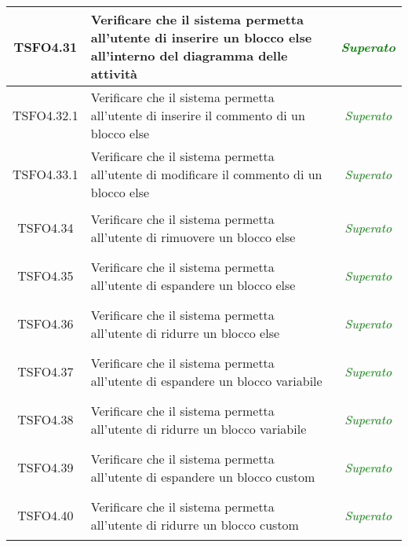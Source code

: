 \begin{longtable}{|c|>{}m{8cm}|c|}
\hypertarget{TSFO4.31}{TSFO4.31} & Verificare che il sistema permetta all'utente di inserire un blocco else all'interno del diagramma delle attività & \textcolor{Green}{\textit{Superato}}\\ \hline
\hypertarget{TSFO4.32.1}{TSFO4.32.1} & Verificare che il sistema permetta all'utente di inserire il commento di un blocco else & \textcolor{Green}{\textit{Superato}}\\ \hline
\hypertarget{TSFO4.33.1}{TSFO4.33.1} & Verificare che il sistema permetta all'utente di modificare il commento di un blocco else & \textcolor{Green}{\textit{Superato}}\\ \hline
\hypertarget{TSFO4.34}{TSFO4.34} & Verificare che il sistema permetta all'utente di rimuovere un blocco else & \textcolor{Green}{\textit{Superato}}\\ \hline
\hypertarget{TSFO4.35}{TSFO4.35} & Verificare che il sistema permetta all'utente di espandere un blocco else & \textcolor{Green}{\textit{Superato}}\\ \hline
\hypertarget{TSFO4.36}{TSFO4.36} & Verificare che il sistema permetta all'utente di ridurre un blocco else & \textcolor{Green}{\textit{Superato}}\\ \hline
\hypertarget{TSFO4.37}{TSFO4.37} & Verificare che il sistema permetta all'utente di espandere un blocco variabile & \textcolor{Green}{\textit{Superato}}\\ \hline
\hypertarget{TSFO4.38}{TSFO4.38} & Verificare che il sistema permetta all'utente di ridurre un blocco variabile & \textcolor{Green}{\textit{Superato}}\\ \hline
\hypertarget{TSFO4.39}{TSFO4.39} & Verificare che il sistema permetta all'utente di espandere un blocco custom & \textcolor{Green}{\textit{Superato}}\\ \hline
\hypertarget{TSFO4.40}{TSFO4.40} & Verificare che il sistema permetta all'utente di ridurre un blocco custom & \textcolor{Green}{\textit{Superato}}\\ \hline


\end{longtable}
